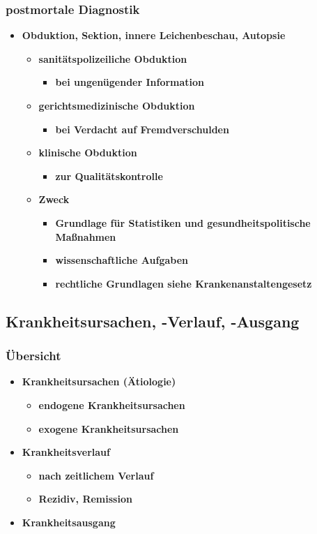 \subsubsection{postmortale Diagnostik}
	\begin{itemize}
		\item \textbf{Obduktion, Sektion, innere Leichenbeschau, Autopsie}
			\begin{itemize}
				\item \textbf{sanitätspolizeiliche Obduktion}
					\begin{itemize}
						\item \textbf{bei ungenügender Information}
					\end{itemize}
				\item \textbf{gerichtsmedizinische Obduktion}
					\begin{itemize}
						\item \textbf{bei Verdacht auf Fremdverschulden}
					\end{itemize}
				\item \textbf{klinische Obduktion}
					\begin{itemize}
						\item \textbf{zur Qualitätskontrolle}
					\end{itemize}
				\item \textbf{Zweck}
					\begin{itemize}
						\item \textbf{Grundlage für Statistiken und gesundheitspolitische Maßnahmen}
						\item \textbf{wissenschaftliche Aufgaben}
						\item \textbf{rechtliche Grundlagen siehe Krankenanstaltengesetz}
					\end{itemize}
			\end{itemize}
	\end{itemize}

\subsection{Krankheitsursachen, -Verlauf, -Ausgang}
\subsubsection{Übersicht}
	\begin{itemize}
		\item \textbf{Krankheitsursachen (Ätiologie)}
			\begin{itemize}
				\item \textbf{endogene Krankheitsursachen}
				\item \textbf{exogene Krankheitsursachen}
			\end{itemize}
		\item \textbf{Krankheitsverlauf}
			\begin{itemize}
				\item \textbf{nach zeitlichem Verlauf}
				\item \textbf{Rezidiv, Remission}
			\end{itemize}
		\item \textbf{Krankheitsausgang}
	\end{itemize}

